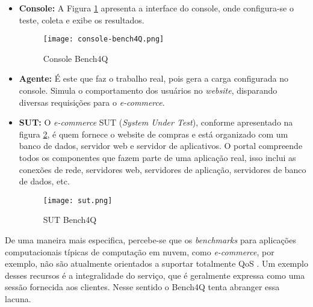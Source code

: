 \begin{itemize}
	
	\item \textbf{Console:} A Figura \ref{fig:console-bench4q} apresenta a interface do console, onde configura-se o teste, coleta e exibe os resultados. 
	
	\begin{figure}[!htb]
		\centering
		\texttt{[image: console-bench4Q.png]}
		\caption{Console Bench4Q}
		\label{fig:console-bench4q}
	\end{figure}
	
	\item \textbf{Agente:} É este que faz o trabalho real, pois gera a carga configurada no console. Simula o comportamento dos usuários no \textit{website}, disparando diversas requisições para o \textit{e-commerce}. 
	
	\item \textbf{SUT:} O \textit{e-commerce} SUT (\textit{System Under Test}), conforme apresentado na figura \ref{fig:sut},  é quem fornece o website de compras e está organizado com um banco de dados, servidor web e servidor de aplicativos. O portal compreende todos os componentes que fazem parte de uma aplicação real, isso inclui as conexões de rede, servidores web, servidores de aplicação, servidores de banco de dados, etc.
	
	\begin{figure}[htb]
		\centering
		\texttt{[image: sut.png]}
		\caption{SUT Bench4Q}
		\label{fig:sut}
	\end{figure}
	
\end{itemize}

De uma maneira mais especifica, percebe-se que os \textit{benchmarks} para aplicações computacionais típicas de computação em nuvem, como \textit{e-commerce}, por exemplo, não são atualmente orientados a suportar totalmente QoS %
\cite{Zhang2011}. Um exemplo desses recursos é a integralidade do serviço, que é geralmente expressa como uma sessão fornecida aos clientes. Nesse sentido o Bench4Q tenta abranger essa lacuna.


